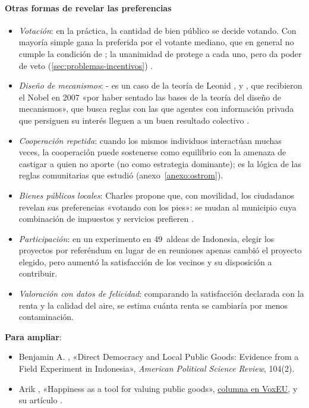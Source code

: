\documentclass[11pt]{article}
\begin{document}
\paragraph{Otras formas de revelar las preferencias}
\begin{itemize}
\item \emph{Votación}: en la práctica, la cantidad de bien público se decide votando. Con mayoría simple gana la preferida por el votante mediano, que en general no cumple la condición de ; la unanimidad de  protege a cada uno, pero da poder de veto (\ref{sec:problemas-incentivos}) .
\item \emph{Diseño de mecanismos}: - es un caso de la teoría de Leonid \textcite{Hurwicz1972Informationally},  y \nocite{Nobel2007HurwiczMaskinMyerson}, que recibieron el Nobel en 2007 «por haber sentado las bases de la teoría del diseño de mecanismos», que busca reglas con las que agentes con información privada que persiguen su interés lleguen a un buen resultado colectivo .
\item \emph{Cooperación repetida}: cuando los mismos individuos interactúan muchas veces, la cooperación puede sostenerse como equilibrio con la amenaza de castigar a quien no aporte (no como estrategia dominante); es la lógica de las reglas comunitarias que estudió \textcite{Ostrom1990Governing} (anexo~\ref{anexo:ostrom}).
\item \emph{Bienes públicos locales}: Charles \textcite{Tiebout1956Pure} propone que, con movilidad, los ciudadanos revelan sus preferencias «votando con los pies»: se mudan al municipio cuya combinación de impuestos y servicios prefieren .
\item \emph{Participación}: en un experimento en 49~aldeas de Indonesia, elegir los proyectos por referéndum en lugar de en reuniones apenas cambió el proyecto elegido, pero aumentó la satisfacción de los vecinos y su disposición a contribuir\nocite{Olken2010Direct}.
\item \emph{Valoración con datos de felicidad}: comparando la satisfacción declarada con la renta y la calidad del aire, se estima cuánta renta se cambiaría por menos contaminación\nocite{Levinson2012Valuing}.
\end{itemize}

\begin{anotaciones}
\textbf{Para ampliar}:
\begin{itemize}
\item Benjamin A. \textcite{Olken2010Direct}, «Direct Democracy and Local Public Goods: Evidence from a Field Experiment in Indonesia», \emph{American Political Science Review}, 104(2).
\item Arik \textcite{Levinson2009Happiness}, «Happiness as a tool for valuing public goods», \href{https://cepr.org/voxeu/columns/happiness-tool-valuing-public-goods}{columna en VoxEU}, y su artículo \textcite{Levinson2012Valuing}.
\end{itemize}
\end{anotaciones}
\end{document}
